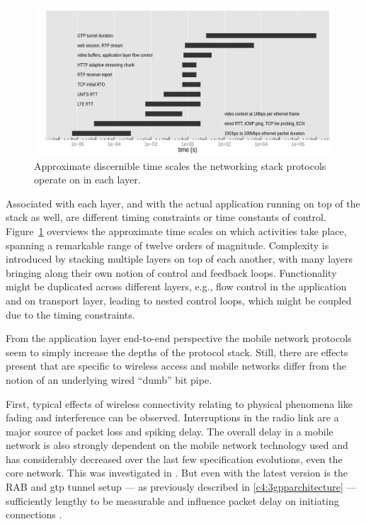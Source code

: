 \begin{figure}[htb]
	\centering
	\includegraphics[width=1.0\textwidth]{images/layer-timescales.pdf}
	\caption{Approximate discernible time scales the networking stack protocols operate on in each layer.}
\label{c5:fig:timescales}
\end{figure}


Associated with each layer, and with the actual application running on top of the stack as well, are different timing constraints or time constants of control. Figure~\ref{c5:fig:timescales} overviews the approximate time scales on which activities take place, spanning a remarkable range of twelve orders of magnitude. Complexity is introduced by stacking multiple layers on top of each another, with many layers bringing along their own notion of control and feedback loops. Functionality might be duplicated across different layers, e.g., flow control in the application and on transport layer, leading to nested control loops, which might be coupled due to the timing constraints.

From the application layer end-to-end perspective the mobile network protocols seem to simply increase the depths of the protocol stack. Still, there are effects present that are specific to wireless access and mobile networks differ from the notion of an underlying wired ``dumb'' bit pipe.

First, typical effects of wireless connectivity relating to physical phenomena like fading and interference can be observed. Interruptions in the radio link are a major source of packet loss and spiking delay.
The overall delay in a mobile network is also strongly dependent on the mobile network technology used and has considerably decreased over the last few specification evolutions, even the core network. This was investigated in  \cite{laner2011dissecting3gdelay}. But even with the latest version is the \gls{RAB} and \gls{gtp} tunnel setup --- as previously described in \ref{c4:3gpparchitecture} --- sufficiently lengthy to be measurable and influence packet delay on initiating connections \cite{arlos2010packetsizedelayinfluence}.

